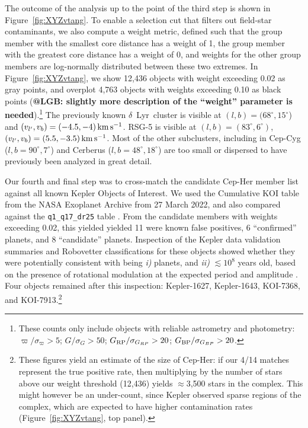 \documentclass[12pt,twocolumn]{aastex63}
\newcommand{\mkms}{{\rm \,km\,s^{-1}}}  %
\begin{document}
The outcome of the analysis up to the point of the third step is shown
in Figure~\ref{fig:XYZvtang}.  To enable a selection cut that filters
out field-star contaminants, we also compute a weight metric, defined
such that the group member with the smallest core distance has a
weight of 1, the group member with the greatest core distance has a
weight of 0, and weights for the other group members are log-normally
distributed between these two extremes.  In Figure~\ref{fig:XYZvtang},
we show 12{,}436 objects with weight exceeding 0.02 as gray points,
and overplot 4{,}763 objects with weights exceeding 0.10 as black
points ({\bf @LGB: slightly more description of the ``weight'' parameter
is needed}).\footnote{These counts only include objects with reliable
astrometry and photometry: $\varpi/\sigma_\varpi>5$;
$G/\sigma_{G}>50$; $G_{\rm RP}/\sigma_{G_{RP}}>20$; $G_{\rm
BP}/\sigma_{G_{BP}}>20$.} The previously known $\delta$~Lyr\ cluster
is visible at $(l,b)=(68^\circ,15^\circ$) and $(v_{l'}, v_b)=(-4.5
,-4 )\mkms$.  RSG-5 is visible at $(l,b)=(83^\circ,6^\circ)$,
$(v_{l'}, v_b)=(5.5 ,-3.5 )\mkms$.  Most of the other
subclusters, including in Cep-Cyg ($l,b=90^\circ,7^\circ$) and
Cerberus ($l,b=48^\circ,18^\circ$) are too small or dispersed to have
previously been analyzed in great detail.

%
%
Our fourth and final step was to cross-match the candidate Cep-Her
member list against all known Kepler Objects of Interest.  We used the
Cumulative KOI table from the NASA Exoplanet Archive from 27 March
2022, and also compared against the \texttt{q1\_q17\_dr25} table
\citep{thompson_planetary_2018}.  From the candidate members
with weights exceeding 0.02, this yielded
 yielded 11 were known false positives, 6 ``confirmed'' planets, and 8
 ``candidate'' planets.  
Inspection of the Kepler data validation summaries and Robovetter
classifications for these objects showed whether they were
potentially consistent with being {\it i)} planets, and {\it ii)}
$\lesssim 10^8$ years old, based on the presence of rotational
modulation at the expected period and amplitude \citep[{e.g.},][Figure~9]{rebull_rotation_2020}.  Four objects remained after
this inspection: Kepler-1627, Kepler-1643, KOI-7368, and
KOI-7913.\footnote{These figures
yield an estimate of the size of Cep-Her: if our 4/14
matches represent the true positive rate, then
multiplying by the number of stars above our weight threshold
(12{,}436) yields $\approx$3{,}500 stars in the complex.  
This might however be an under-count,
since Kepler observed sparse 
regions of the complex, which are expected to have higher
contamination rates (Figure~\ref{fig:XYZvtang}, top panel).}
\end{document}

